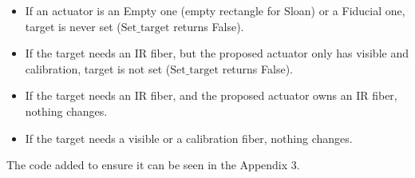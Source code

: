 \begin{itemize}
	\item If an actuator is an Empty one (empty rectangle for Sloan) or a Fiducial one, target is never set ($\textrm{Set_target}$ returns False). 
	\item If the target needs an IR fiber, but the proposed actuator only has visible and calibration, target is not set ($\textrm{Set_target}$ returns False).
	\item If the target needs an IR fiber, and the proposed actuator owns an IR fiber, nothing changes.
	\item If the target needs a visible or a calibration fiber, nothing changes.
\end{itemize}

The code added to ensure it can be seen in the Appendix 3.
